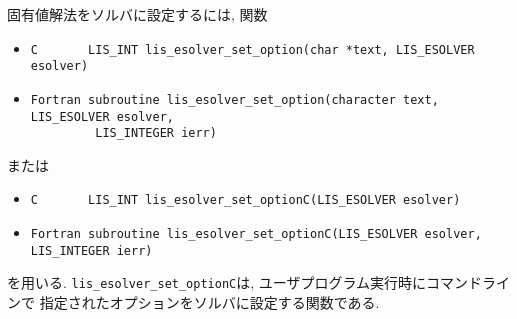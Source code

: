 \documentclass[a4paper]{jarticle}
\begin{document}
{{固有値解法をソルバに設定するには, 関数 
\begin{itemize}
\item \verb|C       LIS_INT lis_esolver_set_option(char *text, LIS_ESOLVER esolver)|
\item \verb|Fortran subroutine lis_esolver_set_option(character text, LIS_ESOLVER esolver,|\\
      \verb|         LIS_INTEGER ierr)|
\end{itemize}
または
\begin{itemize}
\item \verb|C       LIS_INT lis_esolver_set_optionC(LIS_ESOLVER esolver)|
\item \verb|Fortran subroutine lis_esolver_set_optionC(LIS_ESOLVER esolver, LIS_INTEGER ierr)|
\end{itemize}
を用いる. 
\verb|lis_esolver_set_optionC|は, ユーザプログラム実行時にコマンドラインで
指定されたオプションをソルバに設定する関数である. 

}}
\end{document}
